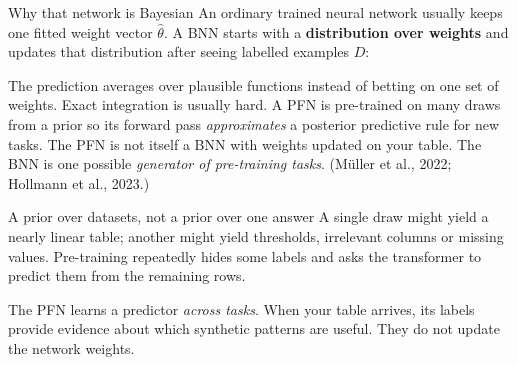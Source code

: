 \documentclass[aspectratio=169]{beamer}
\begin{document}
\begin{frame}{Why that network is Bayesian}
  \small
  An ordinary trained neural network usually keeps one fitted weight vector
  $\hat\theta$. A BNN starts with a \textbf{distribution over weights} and updates that
  distribution after seeing labelled examples $D$:
  \vskip 8pt
  \begin{center}
  \end{center}
  \vskip 8pt
  The prediction averages over plausible functions instead of betting on one set of weights.
  Exact integration is usually hard. A PFN is pre-trained on many draws from a prior so its
  forward pass \emph{approximates} a posterior predictive rule for new tasks.
  \vskip 4pt
  \footnotesize
  The PFN is not itself a BNN with weights updated on your table. The BNN is one possible
  \emph{generator of pre-training tasks}. (M\"uller et al., 2022; Hollmann et al., 2023.)
\end{frame}

\begin{frame}{A prior over datasets, not a prior over one answer}
  \small
  A single draw might yield a nearly linear table; another might yield thresholds,
  irrelevant columns or missing values. Pre-training repeatedly hides some labels and
  asks the transformer to predict them from the remaining rows.
  \vskip 8pt
  \begin{center}
  \end{center}
  \vskip 8pt
  The PFN learns a predictor \emph{across tasks}. When your table arrives, its labels provide
  evidence about which synthetic patterns are useful. They do not update the network weights.
\end{frame}
\end{document}

